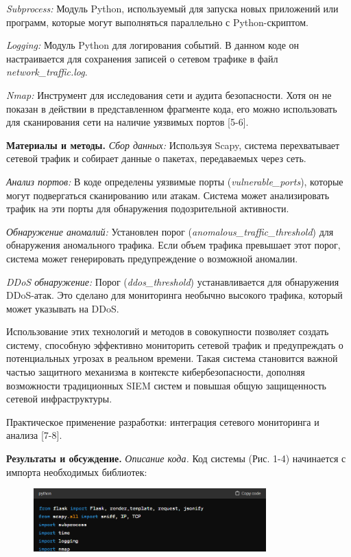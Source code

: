 \emph{Subprocess:} Модуль Python, используемый для запуска новых
приложений или программ, которые могут выполняться параллельно с
Python-скриптом.

\emph{Logging:} Модуль Python для логирования событий. В данном коде он
настраивается для сохранения записей о сетевом трафике в файл
\emph{network\_traffic.log}.

\emph{Nmap:} Инструмент для исследования сети и аудита безопасности.
Хотя он не показан в действии в представленном фрагменте кода, его можно
использовать для сканирования сети на наличие уязвимых портов {[}5-6{]}.

\textbf{Материалы и методы.} \emph{Сбор данных:} Используя Scapy,
система перехватывает сетевой трафик и собирает данные о пакетах,
передаваемых через сеть.

\emph{Анализ портов:} В коде определены уязвимые порты
(\emph{vulnerable\_ports}), которые могут подвергаться сканированию или
атакам. Система может анализировать трафик на эти порты для обнаружения
подозрительной активности.

\emph{Обнаружение аномалий:} Установлен порог
(\emph{anomalous\_traffic\_threshold}) для обнаружения аномального
трафика. Если объем трафика превышает этот порог, система может
генерировать предупреждение о возможной аномалии.

\emph{DDoS обнаружение:} Порог (\emph{ddos\_threshold}) устанавливается
для обнаружения DDoS-атак. Это сделано для мониторинга необычно высокого
трафика, который может указывать на DDoS.

Использование этих технологий и методов в совокупности позволяет создать
систему, способную эффективно мониторить сетевой трафик и предупреждать
о потенциальных угрозах в реальном времени. Такая система становится
важной частью защитного механизма в контексте кибербезопасности,
дополняя возможности традиционных SIEM систем и повышая общую
защищенность сетевой инфраструктуры.

Практическое применение разработки: интеграция сетевого мониторинга и
анализа {[}7-8{]}.

\textbf{Результаты и обсуждение.} \emph{Описание кода.} Код системы
(Рис. 1-4) начинается с импорта необходимых библиотек:

\begin{figure}[H]
	\centering
	\includegraphics[width=0.8\textwidth]{assets/47}
	\caption*{}
\end{figure}

